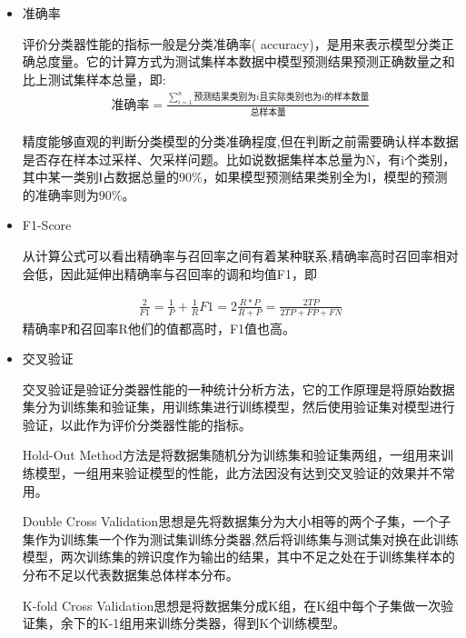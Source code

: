 \begin{itemize}
	\item 准确率
	
	评价分类器性能的指标一般是分类准确率( accuracy)，是用来表示模型分类正确总度量。它的计算方式为测试集样本数据中模型预测结果预测正确数量之和比上测试集样本总量，即:
	\begin{align}
		\text{准确率}=\frac{\sum^n_{i=1}\text{预测结果类别为}i\text{且实际类别也为}i\text{的样本数量}}{\text{总样本量}}
	\end{align}
	
	精度能够直观的判断分类模型的分类准确程度,但在判断之前需要确认样本数据是否存在样本过采样、欠采样问题。比如说数据集样本总量为N，有i个类别，其中某一类别Ⅰ占数据总量的90\%，如果模型预测结果类别全为l，模型的预测的准确率则为90\%。
	
	\item F1-Score
	
	从计算公式可以看出精确率与召回率之间有着某种联系,精确率高时召回率相对会低，因此延伸出精确率与召回率的调和均值F1，即
	
	\begin{align}
		\frac{2}{F1}=\frac{1}{P}+\frac{1}{R}
		F1=2\frac{R * P}{R + P} = \frac{2TP}{2TP + FP + FN}
	\end{align}
	精确率Р和召回率R他们的值都高时，F1值也高。
	
	\item  交叉验证
	
	交叉验证是验证分类器性能的一种统计分析方法，它的工作原理是将原始数据集分为训练集和验证集，用训练集进行训练模型，然后使用验证集对模型进行验证，以此作为评价分类器性能的指标。
	
	Hold-Out Method方法是将数据集随机分为训练集和验证集两组，一组用来训练模型，一组用来验证模型的性能，此方法因没有达到交叉验证的效果并不常用。
	
	Double Cross Validation思想是先将数据集分为大小相等的两个子集，一个子集作为训练集一个作为测试集训练分类器,然后将训练集与测试集对换在此训练模型，两次训练集的辨识度作为输出的结果，其中不足之处在于训练集样本的分布不足以代表数据集总体样本分布。\textsuperscript{\cite{b8}}
	
	K-fold Cross Validation思想是将数据集分成K组，在K组中每个子集做一次验证集，余下的K-1组用来训练分类器，得到K个训练模型。
	
\end{itemize}

